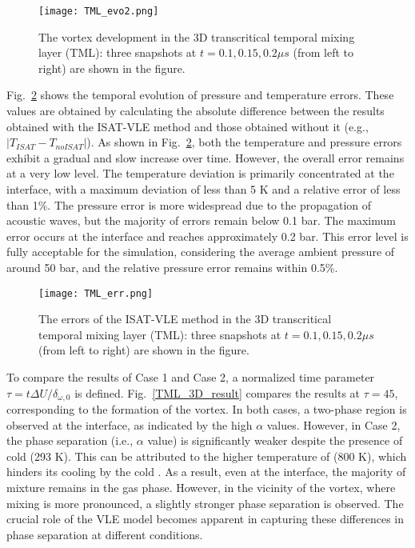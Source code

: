\begin{figure}[htbp]
	\centering
	\texttt{[image: TML\_evo2.png]}
	\caption{The vortex development in the 3D transcritical temporal mixing layer (TML): three snapshots at $t = 0.1, 0.15, 0.2 \mu s$ (from left to right) are shown in the figure.}
	\label{TML_3D_evo}
\end{figure}


Fig.~\ref{TML_3D_err} shows the temporal evolution of pressure and temperature errors. These values are obtained by calculating the absolute difference between the results obtained with the ISAT-VLE method and those obtained without it (e.g., $|T_{ISAT}-T_{noISAT}|$). As shown in Fig.~\ref{TML_3D_err}, both the temperature and pressure errors exhibit a gradual and slow increase over time. However, the overall error remains at a very low level. The temperature deviation is primarily concentrated at the interface, with a maximum deviation of less than 5 K and a relative error of less than 1\%. The pressure error is more widespread due to the propagation of acoustic waves, but the majority of errors remain below 0.1 bar. The maximum error occurs at the interface and reaches approximately 0.2 bar. This error level is fully acceptable for the simulation, considering the average ambient pressure of around 50 bar, and the relative pressure error remains within 0.5\%.

\begin{figure}[htbp]
	\centering
	\texttt{[image: TML\_err.png]}
	\caption{The errors of the ISAT-VLE method in the 3D transcritical temporal mixing layer (TML): three snapshots at $t = 0.1, 0.15, 0.2 \mu s$ (from left to right) are shown in the figure.}
	\label{TML_3D_err}
\end{figure}

To compare the results of Case 1 and Case 2, a normalized time parameter $\tau = t \Delta U/ \delta_{\omega,0}$  is defined. Fig.~\ref{TML_3D_result} compares the results at $\tau = 45$, corresponding to the formation of the vortex. In both cases, a two-phase region is observed at the interface, as indicated by the high $\alpha$ values. However, in Case 2, the phase separation (i.e., $\alpha$ value) is significantly weaker despite the presence of cold  (293 K). This can be attributed to the higher temperature of  (800 K), which hinders its cooling by the cold .  As a result, even at the interface, the majority of mixture remains in the gas phase. However, in the vicinity of the vortex, where mixing is more pronounced, a slightly stronger phase separation is observed. The crucial role of the VLE model becomes apparent in capturing these differences in phase separation at different conditions.


